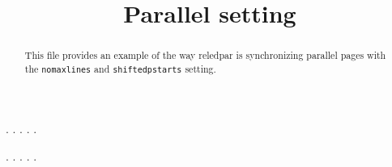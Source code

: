 \documentclass[a5paper,12pt]{article}
\begin{document}
\large

\date{}
\title{Parallel setting}
\maketitle

\begin{abstract}
This file provides an example of the way reledpar is synchronizing parallel pages with the \verb+nomaxlines+ and \verb+shiftedpstarts+ setting.
\end{abstract}


\begin{pages}
    \begin{Leftside}
        \beginnumbering
            . \blindtext[21]
            \pend{}. \blindtext[10]
            \pend{}. \blindtext[6]
            \pend{}. \blindtext[6]
            \pend
            . \blindtext[6]
            \pend
        \endnumbering
    \end{Leftside}
    \begin{Rightside}
        \beginnumbering
            . \blindtext[22]\footnoteAmk
            \pend{}. \blindtext[12]
            \pend{}. \blindtext[12]
            \pend
            . \blindtext[12]
            \pend
            . \blindtext[12]
            \pend
        \endnumbering
    \end{Rightside}
\end{pages}
\Pages
\end{document}
